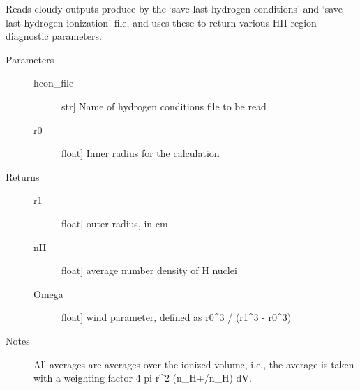 \documentclass[letterpaper,10pt,english]{sphinxmanual}
\begin{document}

\begin{fulllineitems}
\label{cloudy:slugpy.cloudy.read_cloudy_hcon}
Reads cloudy outputs produce by the `save last hydrogen
conditions' and `save last hydrogen ionization' file, and uses
these to return various HII region diagnostic parameters.
\begin{description}
\item[{Parameters}] \leavevmode\begin{description}
\item[{hcon\_file}] \leavevmode{[}str{]}
Name of hydrogen conditions file to be read

\item[{r0}] \leavevmode{[}float{]}
Inner radius for the calculation

\end{description}

\item[{Returns}] \leavevmode\begin{description}
\item[{r1}] \leavevmode{[}float{]}
outer radius, in cm

\item[{nII}] \leavevmode{[}float{]}
average number density of H nuclei

\item[{Omega}] \leavevmode{[}float{]}
wind parameter, defined as r0\textasciicircum{}3 / (r1\textasciicircum{}3 - r0\textasciicircum{}3)

\end{description}

\item[{Notes}] \leavevmode
All averages are averages over the ionized volume, i.e., the
average is taken with a weighting factor 4 pi r\textasciicircum{}2 (n\_H+/n\_H) dV.

\end{description}

\end{fulllineitems}

\end{document}
